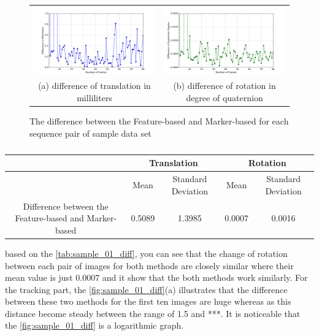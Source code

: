 \begin{figure}[H]
\begin{tabular}{cc}
  \includegraphics[width=80mm]{figures/diff_0/graph_translation} &  \includegraphics[width=80mm]{figures/diff_0/graph_rotation} \\
(a) difference of translation in milliliters & (b) difference of rotation in degree of quaternion \\[6pt]
\end{tabular}
\caption{The difference between the Feature-based and Marker-based for each sequence pair of sample data set}\label{fig:sample_01_diff}
\end{figure}

\begin{table}[H]
\centering
  \begin{tabular}{| c || c | c | c | c |}
      \hline
      & \multicolumn{2}{c}{Translation} & \multicolumn{2}{c}{Rotation} \\ \hline
       & Mean & Standard Deviation & Mean & Standard Deviation \\ \hline
      Difference between the Feature-based and Marker-based & 0.5089 & 1.3985 & 0.0007 & 0.0016 \\ \hline
  \end{tabular}
  \caption{} \label{tab:sample_01_diff}
\end{table}

based on the \autoref{tab:sample_01_diff}, you can see that the change of rotation between each pair of images for both methods are closely similar where their mean value is just 0.0007 and it show that the both methods work similarly. For the tracking part, the \autoref{fig:sample_01_diff}(a) illustrates that the difference between these two methods for the first ten images are huge whereas as this distance become steady between the range of 1.5 and ***. It is noticeable that the \autoref{fig:sample_01_diff} is a logarithmic graph.

